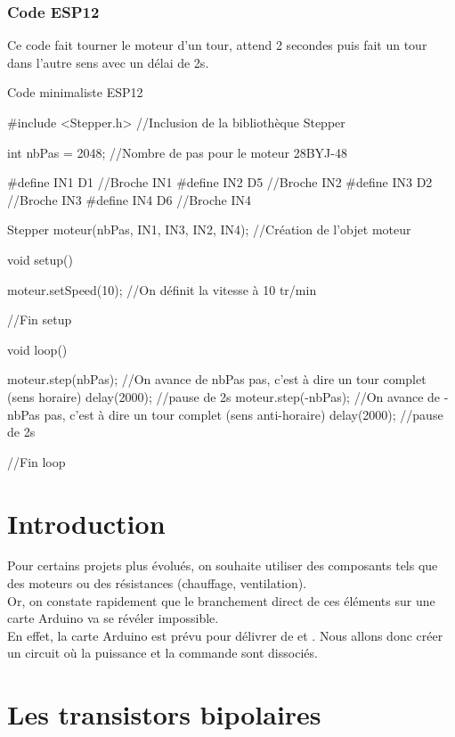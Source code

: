 \subsection{Code ESP12}

Ce code fait tourner le moteur d'un tour, attend 2 secondes puis fait un tour dans l'autre sens avec un délai de 2s.

\begin{Cpp}{Code minimaliste ESP12}

  #include <Stepper.h> //Inclusion de la bibliothèque Stepper
  
  int nbPas = 2048; //Nombre de pas pour le moteur 28BYJ-48
  
  #define IN1 D1  //Broche IN1
  #define IN2 D5  //Broche IN2
  #define IN3 D2  //Broche IN3
  #define IN4 D6  //Broche IN4
  
  Stepper moteur(nbPas, IN1, IN3, IN2, IN4); //Création de l'objet moteur
     
    void setup() {
  
      moteur.setSpeed(10); //On définit la vitesse à 10 tr/min
  
    }//Fin setup
     
    void loop() {
  
      moteur.step(nbPas);   //On avance de nbPas pas, c'est à dire un tour complet (sens horaire)
      delay(2000);          //pause de 2s
      moteur.step(-nbPas);  //On avance de -nbPas pas, c'est à dire un tour complet (sens anti-horaire)
      delay(2000);          //pause de 2s
  
    }//Fin loop
  \end{Cpp}
\chapter{Introduction}

Pour certains projets plus évolués, on souhaite utiliser des composants tels que des moteurs ou des résistances (chauffage, ventilation).\\

Or, on constate rapidement que le branchement direct de ces éléments sur une carte Arduino va se révéler impossible. \\

En effet, la carte Arduino est prévu pour délivrer de  et . Nous allons donc créer un circuit où la puissance et la commande sont dissociés.\chapter{Les transistors bipolaires}

